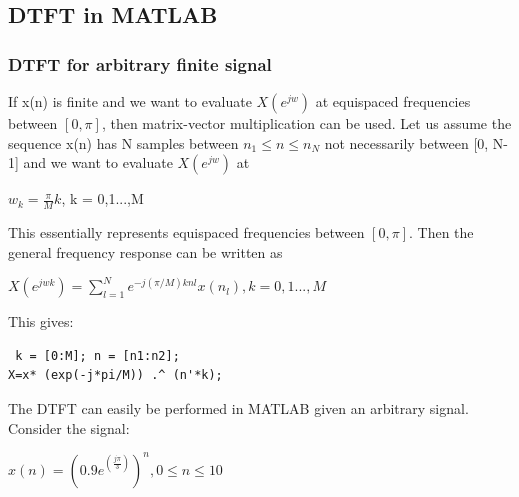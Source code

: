 \documentclass{article}
\begin{document}
\subsection{DTFT in MATLAB}
\subsubsection{DTFT for arbitrary finite signal}
If x(n) is finite and we want to evaluate $X(e^{jw})$ at equispaced frequencies between $[0, \pi]$, then matrix-vector multiplication can be used. Let us assume the sequence x(n) has N samples between $n_1 \leq n \leq n_N$ not necessarily between [0, N-1] and we want to evaluate $X(e^{jw})$ at

\begin{center}
$w_k = \frac{\pi}{M}k$, k = 0,1...,M   
\end{center}
This essentially represents equispaced frequencies between $[0,\pi]$. Then the general frequency response can be written as

\begin{center}
$X(e^{jwk})= \sum_{l=1}^{N}e^{-j(\pi/M)knl}x(n_l), k= 0,1...,M$
\end{center}
This gives:
\begin{lstlisting}
 k = [0:M]; n = [n1:n2];
X=x* (exp(-j*pi/M)) .^ (n'*k);
\end{lstlisting}

The DTFT can easily be performed in MATLAB given an arbitrary signal. \\
Consider the signal: \\
\begin{center}
 $x(n) = (0.9e^{(\frac{j\pi}{3})})^n, 0 \leq n \leq 10$ \\   
\end{center}
\end{document}
